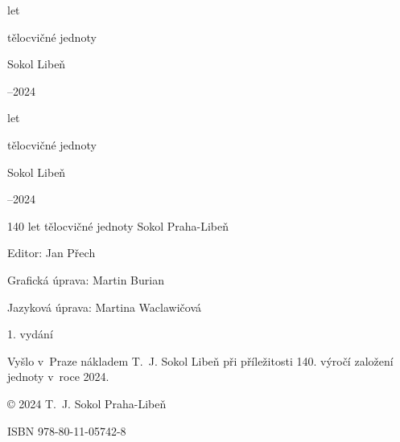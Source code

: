 \documentclass[a5paper, 12pt, twoside]{article}
\newcommand{\titlesize}{\fontsize{36pt}{54pt}}
\begin{document}
\setlength{\oddsidemargin}{-24pt}
\pagecolor{sokolred}
\color{white}
\begin{center}
  \setlength{\parskip}{6pt}
  \vspace*{18pt}
  {\fontsize{56pt}{66pt} let}

  {\titlesize\tyrs tělocvičné jednoty}
  
  {\titlesize\tyrs Sokol Libeň}

  \vspace*{\fill}


  \vspace*{\fill}

  {\titlesize{}–2024}
  \vspace*{-1cm}
\end{center}
\clearpage

\normalcolor
\nopagecolor

\null\clearpage
\setlength{\oddsidemargin}{-4mm}
\setlength{\evensidemargin}{-14mm}

\begin{center}
  \setlength{\parskip}{6pt}
  \vspace*{18pt}
  {\fontsize{56pt}{66pt} let}

  {\titlesize\tyrs tělocvičné jednoty}
  
  {\titlesize\tyrs Sokol Libeň}

  \vspace*{\fill}


  \vspace*{\fill}

  {\titlesize{}–2024}
  \vspace*{-1cm}
\end{center}

\mbox{}
\clearpage

\vspace*{\fill}
{ \parindent0pt \parskip3pt
140 let tělocvičné jednoty Sokol Praha-Libeň

Editor: Jan Přech 

Grafická úprava: Martin Burian 

Jazyková úprava: Martina Waclawičová

1. vydání 

Vyšlo v~Praze nákladem T.~J. Sokol Libeň při příležitosti 140. výročí založení jednoty v~roce 2024.

© 2024 T.~J. Sokol Praha-Libeň

ISBN 978-80-11-05742-8
}
\clearpage
\end{document}

